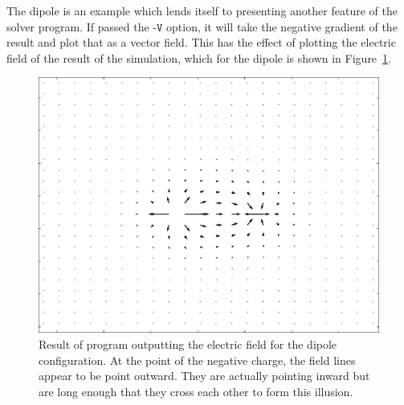 The dipole is an example which lends itself to presenting another feature of the solver program. If passed the
$\texttt{-V}$ option, it will take the negative gradient of the result and plot that as a vector field. This has
the effect of plotting the electric field of the result of the simulation, which for the dipole is shown in
Figure~\ref{fig:dipole-field}.

	\begin{figure}[h]
	\centering
	\includegraphics[width=0.7\linewidth]{dipole_field.pdf}
		\caption[Result of program outputting the electric field for the dipole configuration.]{Result of program outputting the electric field for the dipole configuration. At the point of the negative charge,
		the field lines appear to be point outward. They are actually pointing inward but are long enough that they cross each other to form this illusion.} \label{fig:dipole-field}
	\end{figure}


